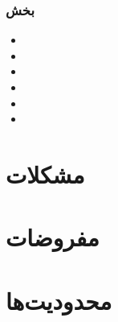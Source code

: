 \subsubsection{بخش }
\begin{itemize}
\item[\risk]

\item[\risk]

\item[\risk]
 
\item[\risk]

\item[\risk]

\item[\risk]
\end{itemize}

\section{مشکلات }

\section{مفروضات }

\section{محدودیت‌ها }

